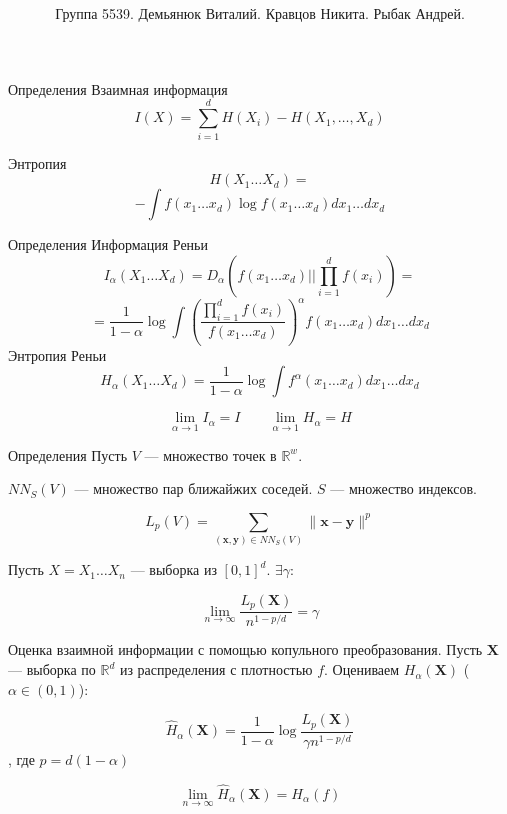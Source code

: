 \documentclass[14pt]{beamer}
\title{
}
\institute{Университет ИТМО}
\author{ Группа 5539. 
Демьянюк Виталий.
Кравцов Никита.
Рыбак Андрей.}
\date{}
\begin{document}
{
\fontsize{14pt}{14pt}\selectfont
{}
\begin{frame}
    \maketitle
\end{frame}
}
\begin{frame}{Определения}
Взаимная информация
$$
I(X) = \sum\limits_{i=1}^{d} H(X_i) - H(X_1, \dots, X_d) 
$$


Энтропия
$$
H(X_1 \dots X_d) =
$$
$$
- \int f (x_1 \dots x_d) \log f (x_1 \dots x_d) d x_1 \dots d x_d
$$
\end{frame}
\begin{frame}{Определения}
Информация Реньи
$$
I_{\alpha}  (X_1 \dots X_d)  = D_{\alpha}
\left ( f(x_1 \dots x_d) || \prod\limits_{i=1}^d f(x_i) \right ) =
$$
$$
= \frac{1}{1-\alpha} \log \int
\left ( \frac {\prod_{i=1}^d f(x_i)} {f(x_1 \dots x_d)} \right )^{\alpha}
f(x_1 \dots x_d) d x_1 \dots d x_d
$$
Энтропия Реньи
$$
H_{\alpha}  (X_1 \dots X_d) = \frac{1}{1-\alpha} \log \int
f^{\alpha} (x_1 \dots x_d)  dx_1 \dots dx_d
$$

$$
\lim_{\alpha \to 1} I_{\alpha} = I \quad \quad \lim_{\alpha \to 1} H_{\alpha} = H
$$
\end{frame}

\begin{frame}{Определения}
    Пусть $V$ — множество точек в $\mathbb R^w$.
    
    $NN_S(V)$ — множество пар ближайжих соседей. $S$ — множество индексов.

    $$ L_p(V) = \sum\limits_{( \mathbf x,\mathbf y) \in NN_S(V)} \| \mathbf x - \mathbf y\|^p $$

    Пусть $ X = X_1 \dots X_n $ — выборка из $[0,1]^d$. $\exists \gamma : $

    $$\lim_{n\to\infty}\frac{L_p(\mathbf X)}{n^{1-p/d}}  = \gamma  $$

\end{frame}

\begin{frame}{Оценка взаимной информации с помощью копульного преобразования.}
    Пусть $ \mathbf X $ — выборка по $\mathbb R^d$ из распределения с плотностью $f$.
    Оцениваем $H_\alpha(\mathbf X)$ ($\alpha \in (0,1)$):

    $$ \widehat H_\alpha (\mathbf X) = \frac {1}{1-\alpha} \log \frac{L_p(\mathbf X) }{\gamma n^{1-p/d}}$$,
    где $p= d(1-\alpha) $

    $$\lim_{n\to \infty} \widehat H_\alpha (\mathbf X) = H_\alpha(f) $$
\end{frame}
\end{document}
